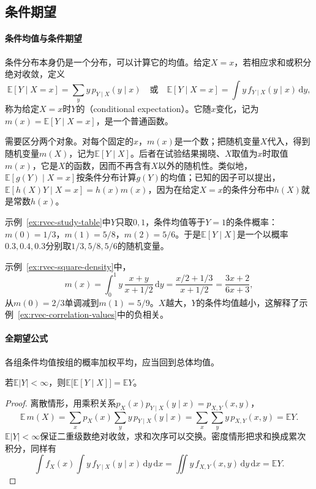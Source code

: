 \subsection{条件期望}
\label{sec:rvec-conditional-expectation}

\paragraph{条件均值与条件期望}
条件分布本身仍是一个分布，可以计算它的均值。给定$X=x$，若相应求和或积分绝对收敛，定义
\[
 \mathbb E[Y\mid X=x]=\sum_yy\,p_{Y\mid X}(y\mid x)
 \quad\text{或}\quad
 \mathbb E[Y\mid X=x]=\int y\,f_{Y\mid X}(y\mid x)\,\mathrm dy ,
\]
称为给定$X=x$时$Y$的（conditional expectation）。它随$x$变化，记为$m(x)=\mathbb E[Y\mid X=x]$，是一个普通函数。

需要区分两个对象。对每个固定的$x$，$m(x)$是一个数；把随机变量$X$代入，得到随机变量$m(X)$，记为$\mathbb E[Y\mid X]$。后者在试验结果揭晓、$X$取值为$x$时取值$m(x)$，它是$X$的函数，因而不再含有$X$以外的随机性。类似地，$\mathbb E[g(Y)\mid X=x]$按条件分布计算$g(Y)$的均值；已知的因子可以提出，$\mathbb E[h(X)Y\mid X=x]=h(x)m(x)$，因为在给定$X=x$的条件分布中$h(X)$就是常数$h(x)$。

\begin{example}[两个例子的条件期望]
\label{ex:rvec-conditional-means}
示例~\ref{ex:rvec-study-table}中$Y$只取$0,1$，条件均值等于$Y=1$的条件概率：$m(0)=1/3$，$m(1)=5/8$，$m(2)=5/6$。于是$\mathbb E[Y\mid X]$是一个以概率$0.3,0.4,0.3$分别取$1/3,5/8,5/6$的随机变量。

示例~\ref{ex:rvec-square-density}中，
\[
 m(x)=\int_0^1y\,\frac{x+y}{x+1/2}\,\mathrm dy=\frac{x/2+1/3}{x+1/2}=\frac{3x+2}{6x+3},
\]
从$m(0)=2/3$单调减到$m(1)=5/9$。$X$越大，$Y$的条件均值越小，这解释了示例~\ref{ex:rvec-correlation-values}中的负相关。
\end{example}

\paragraph{全期望公式}
各组条件均值按组的概率加权平均，应当回到总体均值。

\begin{theorem}[全期望公式]
\label{thm:rvec-total-expectation}
若$\mathbb E|Y|<\infty$，则$\mathbb E\bigl[\mathbb E[Y\mid X]\bigr]=\mathbb EY$。
\end{theorem}

\begin{proof}
离散情形，用乘积关系$p_X(x)p_{Y\mid X}(y\mid x)=p_{X,Y}(x,y)$，
\[
 \mathbb E\,m(X)=\sum_xp_X(x)\sum_yy\,p_{Y\mid X}(y\mid x)=\sum_x\sum_yy\,p_{X,Y}(x,y)=\mathbb EY .
\]
$\mathbb E|Y|<\infty$保证二重级数绝对收敛，求和次序可以交换。密度情形把求和换成累次积分，同样有
\[
 \int f_X(x)\int y\,f_{Y\mid X}(y\mid x)\,\mathrm dy\,\mathrm dx=\iint y\,f_{X,Y}(x,y)\,\mathrm dy\,\mathrm dx=\mathbb EY .
\]
\end{proof}

